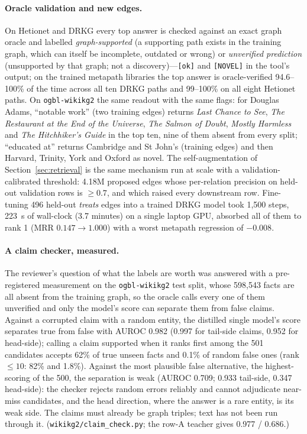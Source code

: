 \documentclass[11pt,a4paper]{article}
\begin{document}
\paragraph{Oracle validation and new edges.} On Hetionet
\citep{himmelstein2017hetionet} and DRKG every top answer is checked
against an exact graph oracle and labelled \emph{graph-supported} (a
supporting path exists in the training graph, which can itself be
incomplete, outdated or wrong) or \emph{unverified prediction}
(unsupported by that graph; not a discovery)---\texttt{[ok]} and
\texttt{[NOVEL]} in the tool's output; on the trained metapath libraries the top answer is
oracle-verified 94.6--100\% of the time across all ten DRKG paths and
99--100\% on all eight Hetionet paths. On \texttt{ogbl-wikikg2} the same
readout with the same flags: for Douglas Adams, ``notable work'' (two
training edges) returns \emph{Last Chance to See}, \emph{The Restaurant
at the End of the Universe}, \emph{The Salmon of Doubt}, \emph{Mostly
Harmless} and \emph{The Hitchhiker's Guide} in the top ten, nine of them
absent from every split; ``educated at'' returns Cambridge and St John's
(training edges) and then Harvard, Trinity, York and Oxford as novel. The
self-augmentation of Section~\ref{sec:retrieval} is the same mechanism
run at scale with a validation-calibrated threshold: 4.18M proposed
edges whose per-relation precision on held-out validation rows is
$\ge0.7$, and which raised every downstream row. Fine-tuning 496 held-out
\emph{treats} edges into a trained DRKG model took 1{,}500 steps, 223~s
of wall-clock (3.7 minutes) on a single laptop GPU, absorbed all of them
to rank 1 (MRR $0.147\to1.000$) with a worst metapath regression of
$-0.008$.

\paragraph{A claim checker, measured.} The reviewer's question of what
the labels are worth was answered with a pre-registered measurement on
the \texttt{ogbl-wikikg2} test split, whose 598{,}543 facts are all
absent from the training graph, so the oracle calls every one of them
unverified and only the model's score can separate them from false
claims. Against a corrupted claim with a random entity, the distilled
single model's score separates true from false with AUROC 0.982 (0.997
for tail-side claims, 0.952 for head-side); calling a claim supported
when it ranks first among the 501 candidates accepts 62\% of true unseen
facts and 0.1\% of random false ones (rank $\le10$: 82\% and 1.8\%).
Against the most plausible false alternative, the highest-scoring of the
500, the separation is weak (AUROC 0.709; 0.933 tail-side, 0.347
head-side): the checker rejects random errors reliably and cannot
adjudicate near-miss candidates, and the head direction, where the
answer is a rare entity, is its weak side. The claims must already be
graph triples; text has not been run through it.
(\texttt{wikikg2/claim\_check.py}; the row-A teacher gives 0.977 / 0.686.)
\end{document}
